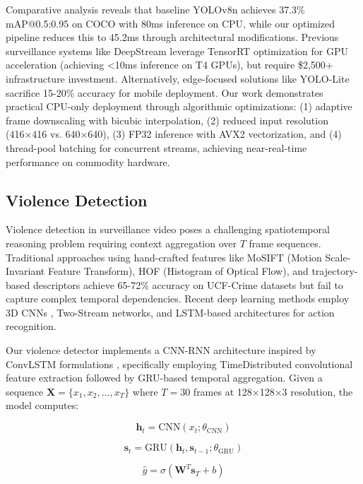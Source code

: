 \documentclass[conference]{IEEEtran}
\begin{document}
Comparative analysis reveals that baseline YOLOv8n achieves 37.3\% mAP@0.5:0.95 on COCO with 80ms inference on CPU, while our optimized pipeline reduces this to 45.2ms through architectural modifications. Previous surveillance systems like DeepStream \cite{deepstream} leverage TensorRT optimization for GPU acceleration (achieving <10ms inference on T4 GPUs), but require \$2,500+ infrastructure investment. Alternatively, edge-focused solutions like YOLO-Lite sacrifice 15-20\% accuracy for mobile deployment. Our work demonstrates practical CPU-only deployment through algorithmic optimizations: (1) adaptive frame downscaling with bicubic interpolation, (2) reduced input resolution (416×416 vs. 640×640), (3) FP32 inference with AVX2 vectorization, and (4) thread-pool batching for concurrent streams, achieving near-real-time performance on commodity hardware.

\subsection{Violence Detection}
Violence detection in surveillance video poses a challenging spatiotemporal reasoning problem requiring context aggregation over $T$ frame sequences. Traditional approaches using hand-crafted features like MoSIFT (Motion Scale-Invariant Feature Transform), HOF (Histogram of Optical Flow), and trajectory-based descriptors achieve 65-72\% accuracy on UCF-Crime datasets but fail to capture complex temporal dependencies. Recent deep learning methods employ 3D CNNs \cite{i3d-paper}, Two-Stream networks, and LSTM-based architectures for action recognition.

Our violence detector implements a CNN-RNN architecture inspired by ConvLSTM formulations \cite{violence-cnn-rnn}, specifically employing TimeDistributed convolutional feature extraction followed by GRU-based temporal aggregation. Given a sequence $\mathbf{X} = \{x_1, x_2, ..., x_T\}$ where $T=30$ frames at 128×128×3 resolution, the model computes:

\begin{equation}
\mathbf{h}_t = \text{CNN}(x_t; \theta_{\text{CNN}})
\end{equation}

\begin{equation}
\mathbf{s}_t = \text{GRU}(\mathbf{h}_t, \mathbf{s}_{t-1}; \theta_{\text{GRU}})
\end{equation}

\begin{equation}
\hat{y} = \sigma(\mathbf{W}^T \mathbf{s}_T + b)
\end{equation}
\end{document}
